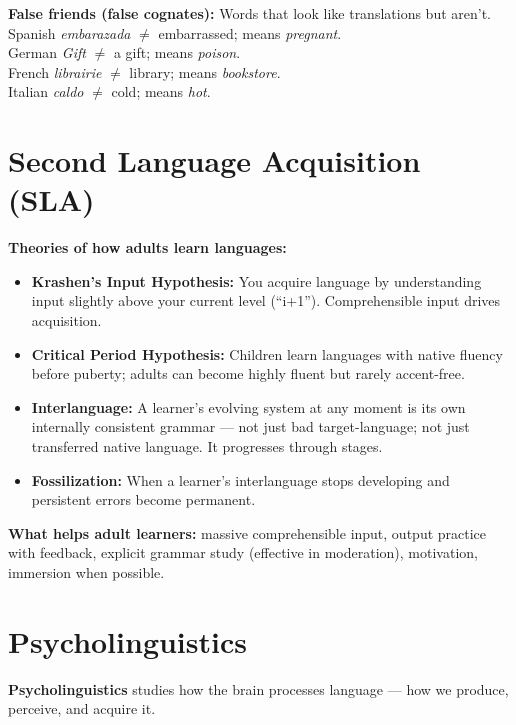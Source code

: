 \documentclass[11pt, letterpaper]{article}
\begin{document}
\textbf{False friends (false cognates):} Words that look like translations but aren't.\\
\quad Spanish \emph{embarazada} $\neq$ embarrassed; means \emph{pregnant}.\\
\quad German \emph{Gift} $\neq$ a gift; means \emph{poison}.\\
\quad French \emph{librairie} $\neq$ library; means \emph{bookstore}.\\
\quad Italian \emph{caldo} $\neq$ cold; means \emph{hot}.

\section*{Second Language Acquisition (SLA)}

\textbf{Theories of how adults learn languages:}
\begin{itemize}[noitemsep]
  \item \textbf{Krashen's Input Hypothesis:} You acquire language by understanding input slightly above your current level (``i+1''). Comprehensible input drives acquisition.
  \item \textbf{Critical Period Hypothesis:} Children learn languages with native fluency before puberty; adults can become highly fluent but rarely accent-free.
  \item \textbf{Interlanguage:} A learner's evolving system at any moment is its own internally consistent grammar --- not just bad target-language; not just transferred native language. It progresses through stages.
  \item \textbf{Fossilization:} When a learner's interlanguage stops developing and persistent errors become permanent.
\end{itemize}

\textbf{What helps adult learners:} massive comprehensible input, output practice with feedback, explicit grammar study (effective in moderation), motivation, immersion when possible.

\section*{Psycholinguistics}

\textbf{Psycholinguistics} studies how the brain processes language --- how we produce, perceive, and acquire it.
\end{document}
